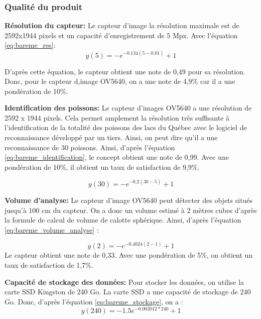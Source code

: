 \subsubsection{Qualité du produit}

\textbf{Résolution du capteur:}
Le capteur d'image la résolution maximale est de 2592x1944 pixels et un capacité d'enregistrement de 5 Mpx. Avec l'équation \ref{eq:bareme_res}:
\begin{equation}
    y(5) = - e^{-0.134(5-0.01)}+1
\end{equation}

D'après cette équation, le capteur obtient une note de 0,49 pour sa résolution. Donc, pour le capteur d,image OV5640, on a une note de 4,9\% car il a une pondération de 10\%.
\vspace{5mm}


\textbf{Identification des poissons:}
Le capteur d'images OV5640 a une résolution de 2592 x 1944 pixels. Cela permet amplement la résolution très suffisante à l'identification de la totalité des poissons des lacs du Québec avec le logiciel de reconnaissance développé par un tiers. Ainsi, on peut dire qu'il a une reconnaissance de 30 poissons. Ainsi, d'après l'équation \ref{eq:bareme_identification}, le concept obtient une note de 0,99. Avec une pondération de 10\%, il obtient un taux de satisfaction de 9,9\%.

\begin{equation}
    y(30) = -e^{-0.2(30-5)} + 1  \end{equation}
\vspace{5mm}


\textbf{Volume d'analyse:}
Le capteur d'image OV5640 peut détecter des objets situés jusqu'à 100 cm du capteur. On a donc un volume estimé à 2 mètres cubes d'après la formule de calcul de volume de calotte sphérique. Ainsi, d'après l'équation \ref{eq:bareme_volume_analyse} :

\begin{equation}
y(2) =
        -e^{-0.4024(2-1)}+1 
\end{equation}
Le capteur obtient une note de 0,33. Avec une pondération de 5\%, on obtient un taux de satisfaction de 1,7\%.
\vspace{5mm}


\textbf{Capacité de stockage des données:}
Pour stocker les données, on utilise la carte SSD Kingston de 240 Go. La carte SSD a une capacité de stockage de 240 Go. Donc, d'après l'équation \ref{eq:bareme_stockage}, on a :
\begin{equation}
    y(240) = -1.5e^{-0.002012*240} + 1
\end{equation}

